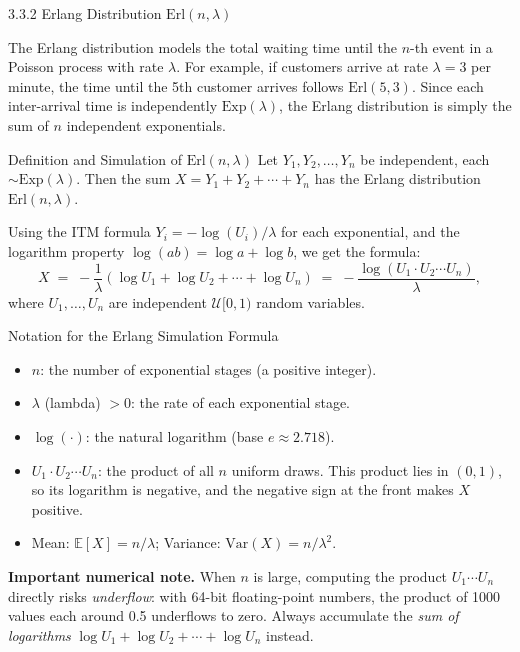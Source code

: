 \documentclass[aspectratio=169,10pt]{beamer}
\newcommand{\EE}{\mathbb{E}}
\newcommand{\UU}{\mathcal{U}}
\begin{document}
\begin{frame}[allowframebreaks]{3.3.2 Erlang Distribution $\mathrm{Erl}(n,\lambda)$}

The Erlang distribution models the total waiting time until the $n$-th event
in a Poisson process with rate $\lambda$.  For example, if customers arrive at
rate $\lambda = 3$ per minute, the time until the 5th customer arrives follows
$\mathrm{Erl}(5, 3)$.  Since each inter-arrival time is independently
$\mathrm{Exp}(\lambda)$, the Erlang distribution is simply the sum of $n$
independent exponentials.

\begin{block}{Definition and Simulation of $\mathrm{Erl}(n,\lambda)$}
  Let $Y_1, Y_2, \ldots, Y_n$ be independent, each $\sim \mathrm{Exp}(\lambda)$.
  Then the sum $X = Y_1 + Y_2 + \cdots + Y_n$ has the Erlang distribution
  $\mathrm{Erl}(n, \lambda)$.

  Using the ITM formula $Y_i = -\log(U_i)/\lambda$ for each exponential, and
  the logarithm property $\log(ab) = \log a + \log b$, we get the formula:
  \[
    X \;=\; -\frac{1}{\lambda}\!\left(\log U_1 + \log U_2 + \cdots + \log U_n\right)
       \;=\; -\frac{\log(U_1 \cdot U_2 \cdots U_n)}{\lambda},
  \]
  where $U_1, \ldots, U_n$ are independent $\UU[0,1)$ random variables.
\end{block}

\begin{block}{Notation for the Erlang Simulation Formula}
  \begin{itemize}
    \item $n$: the number of exponential stages (a positive integer).
    \item $\lambda$ (lambda) $> 0$: the rate of each exponential stage.
    \item $\log(\cdot)$: the natural logarithm (base $e \approx 2.718$).
    \item $U_1 \cdot U_2 \cdots U_n$: the product of all $n$ uniform draws.
      This product lies in $(0,1)$, so its logarithm is negative, and the
      negative sign at the front makes $X$ positive.
    \item Mean: $\EE[X] = n/\lambda$; Variance: $\mathrm{Var}(X) = n/\lambda^2$.
  \end{itemize}
\end{block}

\textbf{Important numerical note.}  When $n$ is large, computing the product
$U_1 \cdots U_n$ directly risks \emph{underflow}: with 64-bit floating-point
numbers, the product of 1000 values each around 0.5 underflows to zero.
Always accumulate the \emph{sum of logarithms}
$\log U_1 + \log U_2 + \cdots + \log U_n$ instead.


\end{frame}
\end{document}
